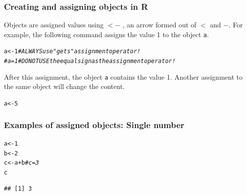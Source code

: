 \documentclass{beamer}\usepackage[]{graphicx}\usepackage[]{color}
\makeatletter
\newcommand{\hlnum}[1]{\textcolor[rgb]{0.686,0.059,0.569}{#1}}%
\newcommand{\hlcom}[1]{\textcolor[rgb]{0.678,0.584,0.686}{\textit{#1}}}%
\newcommand{\hlopt}[1]{\textcolor[rgb]{0,0,0}{#1}}%
\newcommand{\hlstd}[1]{\textcolor[rgb]{0.345,0.345,0.345}{#1}}%
\newcommand{\hlkwb}[1]{\textcolor[rgb]{0.69,0.353,0.396}{#1}}%
\newenvironment{kframe}{%
 \def\at@end@of@kframe{}%
 \ifinner\ifhmode%
  \def\at@end@of@kframe{\end{minipage}}%
  \begin{minipage}{\columnwidth}%
 \fi\fi%
 \def\FrameCommand##1{\hskip\@totalleftmargin \hskip-\fboxsep
 \colorbox{shadecolor}{##1}\hskip-\fboxsep
     \hskip-\linewidth \hskip-\@totalleftmargin \hskip\columnwidth}%
 \MakeFramed {\advance\hsize-\width
   \@totalleftmargin\z@ \linewidth\hsize
   \@setminipage}}%
 {\par\unskip\endMakeFramed%
 \at@end@of@kframe}
\newenvironment{knitrout}{}{} %
\makeatother
\begin{document}
{{%

{
\begin{frame}[fragile]
\frametitle{Creating and assigning objects in R}
Objects are assigned values using $<-$ , an arrow formed out of $<$ and $-$.
For example, the following command assigns the value 1 to the object \texttt{a}.
\begin{knitrout}\scriptsize
{}\color{fgcolor}\begin{kframe}
\begin{alltt}
\hlstd{a} \hlkwb{<-} \hlnum{1} \hlcom{# ALWAYS use "gets" assignment operator!}
\hlcom{# a = 1 # DO NOT USE the equal sign as the assignment operator!}
\end{alltt}
\end{kframe}
\end{knitrout}
After this assignment, the object \texttt{a} contains the value 1.
Another assignment to the same object will change the content.
\begin{knitrout}\scriptsize
{}\color{fgcolor}\begin{kframe}
\begin{alltt}
\hlstd{a} \hlkwb{<-} \hlnum{5}
\end{alltt}
\end{kframe}
\end{knitrout}
\end{frame}


\begin{frame}[fragile]
\frametitle{Examples of assigned objects: Single number}
\begin{knitrout}\scriptsize
{}\color{fgcolor}\begin{kframe}
\begin{alltt}
\hlstd{a} \hlkwb{<-} \hlnum{1}
\hlstd{b} \hlkwb{<-} \hlnum{2}
\hlstd{c} \hlkwb{<-} \hlstd{a} \hlopt{+} \hlstd{b} \hlcom{# c = 3}
\hlstd{c}
\end{alltt}
\begin{verbatim}
## [1] 3
\end{verbatim}
\end{kframe}
\end{knitrout}
\end{frame}

}}}
\end{document}
